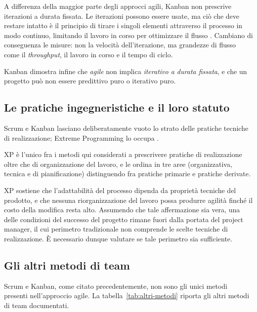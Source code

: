 A differenza della maggior parte degli approcci agili, Kanban non prescrive
iterazioni a durata fissata. Le iterazioni possono essere usate, ma ci\`o che
deve restare intatto \`e il principio di tirare i singoli elementi attraverso
il processo in modo continuo, limitando il lavoro in corso per ottimizzare il
flusso \cite{agilepracticeguide2}. Cambiano di conseguenza le misure: non la
velocit\`a dell'iterazione, ma grandezze di flusso come il \emph{throughput},
il lavoro in corso e il tempo di ciclo.

Kanban dimostra infine che \emph{agile} non implica \emph{iterativo a durata
fissata}, e che un progetto pu\`o non essere predittivo puro o iterativo puro.

\subsection{Le pratiche ingegneristiche e il loro statuto}

Scrum e Kanban lasciano deliberatamente vuoto lo strato delle pratiche tecniche
di realizzazione; Extreme Programming lo occupa \cite{agilepracticeguide2}.

XP \`e l'unico fra i metodi qui considerati a prescrivere pratiche di
realizzazione oltre che di organizzazione del lavoro, e le ordina in tre aree
(organizzativa, tecnica e di pianificazione) distinguendo fra pratiche
primarie e pratiche derivate.

XP sostiene che
l'adattabilit\`a del processo dipenda da propriet\`a tecniche del prodotto, e
che nessuna riorganizzazione del lavoro possa produrre agilit\`a finch\'e il
costo della modifica resta alto. Assumendo che tale affermazione sia vera, una delle
condizioni del successo del progetto rimane fuori dalla portata del project
manager, il cui perimetro tradizionale non comprende le scelte tecniche di
realizzazione. \`E necessario dunque valutare se tale perimetro sia sufficiente.

\subsection{Gli altri metodi di team}

Scrum e Kanban, come citato precedentemente, non sono gli unici metodi presenti
nell'approccio agile. La
tabella~\ref{tab:altri-metodi} riporta gli altri metodi di team documentati.

